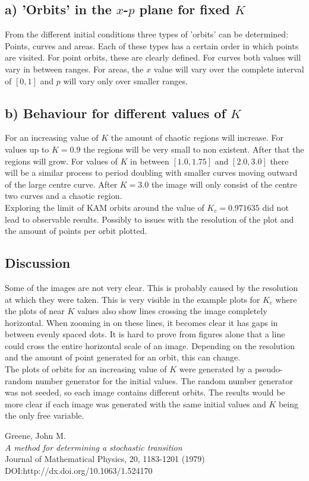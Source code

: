 \documentclass[a4paper,11pt]{article}
\begin{document}
\subsection{a) 'Orbits' in the $x$-$p$ plane for fixed $K$}
From the different initial conditions three types of 'orbits' can be determined: Points, curves and areas. Each of these types has a certain order in which points are visited. For point orbits, these are clearly defined. For curves both values will vary in between ranges. For areas, the $x$ value will vary over the complete interval of $[0,1]$ and $p$ will vary only over smaller ranges.

\newpage

\subsection{b) Behaviour for different values of $K$}
For an increasing value of $K$ the amount of chaotic regions will increase. For values up to $K = 0.9$ the regions will be very small to non existent. After that the regions will grow. For values of $K$ in between $[1.0,1.75]$ and $[2.0,3.0]$ there will be a similar process to period doubling with smaller curves moving outward of the large centre curve. After $K = 3.0$ the image will only consist of the centre two curves and a chaotic region.\\
Exploring the limit of KAM orbits around the value of $K_c = 0.971635$ did not lead to observable results. Possibly to issues with the resolution of the plot and the amount of points per orbit plotted.

\subsection{Discussion}
Some of the images are not very clear. This is probably caused by the resolution at which they were taken. This is very visible in the example plots for $K_c$ where the plots of near $K$ values also show lines crossing the image completely horizontal. When zooming in on these lines, it becomes clear it has gaps in between evenly spaced dots. It is hard to prove from figures alone that a line could cross the entire horizontal scale of an image. Depending on the resolution and the amount of point generated for an orbit, this can change.\\
The plots of orbits for an increasing value of $K$ were generated by a pseudo-random number generator for the initial values. The random number generator was not seeded, so each image contains different orbits. The results would be more clear if each image was generated with the same initial values and $K$ being the only free variable.

\begin{thebibliography}{1337}
Greene, John M.\\
\emph{A method for determining a stochastic transition}\\
Journal of Mathematical Physics, 20, 1183-1201 (1979)\\ DOI:http://dx.doi.org/10.1063/1.524170

\end{thebibliography}
\end{document}
